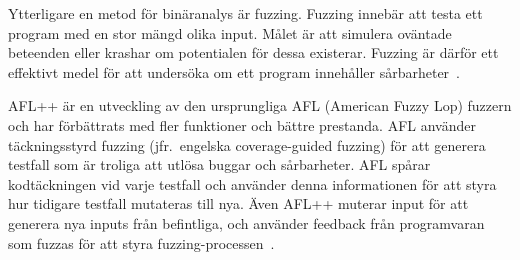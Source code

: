 Ytterligare en metod för binäranalys är fuzzing. Fuzzing innebär att testa ett
program med en stor mängd olika input. Målet är att simulera oväntade beteenden
eller krashar om potentialen för dessa existerar. Fuzzing är därför ett
effektivt medel för att undersöka om ett program innehåller
sårbarheter~\cite{8371326}.

AFL++ är en utveckling av den ursprungliga AFL (American Fuzzy Lop) fuzzern och
har förbättrats med fler funktioner och bättre prestanda. AFL använder
täckningsstyrd fuzzing (jfr.\ engelska coverage-guided fuzzing) för att generera
testfall som är troliga att utlösa buggar och sårbarheter. AFL spårar
kodtäckningen vid varje testfall och använder denna informationen för att styra
hur tidigare testfall mutateras till nya. Även AFL++ muterar input för att
generera nya inputs från befintliga, och använder feedback från programvaran som
fuzzas för att styra fuzzing-processen~\cite{aflplusplus}.
